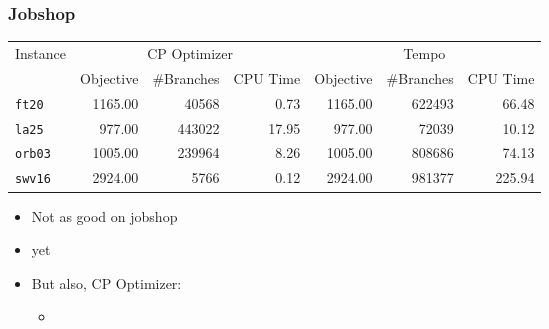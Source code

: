 \begin{frame}
\frametitle{Jobshop}


\vfill

\begin{footnotesize}
\begin{tabular}{lrrrrrr}
\toprule
\multirow{2}{*}{Instance}&  \multicolumn{3}{c}{CP Optimizer} & \multicolumn{3}{c}{Tempo}\\
\cmidrule(rr){2-4}\cmidrule(rr){5-7}
& \multicolumn{1}{c}{Objective} & \multicolumn{1}{c}{\#Branches} & \multicolumn{1}{c}{CPU Time} 
& \multicolumn{1}{c}{Objective} & \multicolumn{1}{c}{\#Branches} & \multicolumn{1}{c}{CPU Time} \\
\midrule

\texttt{ft20} & 1165.00 & 40568 & \cellcolor{green!50}0.73 & 1165.00 & 622493 & \cellcolor{red!50}66.48\\
\texttt{la25} & 977.00 & 443022 & \cellcolor{red!50}17.95 & 977.00 & 72039 & \cellcolor{green!50}10.12\\
\texttt{orb03} & 1005.00 & 239964 & \cellcolor{green!50}8.26 & 1005.00 & 808686 & \cellcolor{red!50}74.13\\
\texttt{swv16} & 2924.00 & 5766 & \cellcolor{green!50}0.12 & 2924.00 & 981377 & \cellcolor{red!50}225.94\\
\bottomrule
\end{tabular}
\end{footnotesize}

\vfill

\begin{itemize}
  \item Not as good on jobshop

  \vfill\pause
  \item yet

  \vfill\pause
  \item But also, CP Optimizer:
  \vfill
  \begin{itemize}
    \item {}
  \end{itemize}
\end{itemize}

\vfill

\end{frame}


% 

